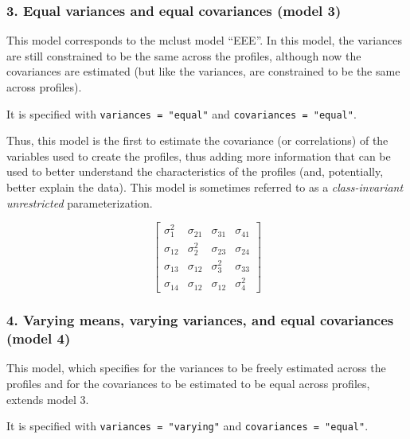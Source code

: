 \documentclass[
  english,
  man]{apa6}
\begin{document}
\hypertarget{equal-variances-and-equal-covariances-model-3}{%
\subsubsection{3. Equal variances and equal covariances (model 3)}\label{equal-variances-and-equal-covariances-model-3}}

This model corresponds to the mclust model \enquote{EEE}. In this model, the variances are still constrained to be the same across the profiles, although now the covariances are estimated (but like the variances, are constrained to be the same across profiles).

It is specified with \texttt{variances\ =\ "equal"} and \texttt{covariances\ =\ "equal"}.

Thus, this model is the first to estimate the covariance (or correlations) of the variables used to create the profiles, thus adding more information that can be used to better understand the characteristics of the profiles (and, potentially, better explain the data). This model is sometimes referred to as a \emph{class-invariant unrestricted} parameterization.

\[
\left[ \begin{matrix} { \sigma  }_{ 1 }^{ 2 } & { \sigma  }_{ 21 } & { \sigma  }_{ 31 } & { \sigma  }_{ 41 } \\ { \sigma  }_{ 12 } & { \sigma  }_{ 2 }^{ 2 } & { \sigma  }_{ 23 } & { \sigma  }_{ 24 } \\ { \sigma  }_{ 13 } & { \sigma  }_{ 12 } & { \sigma  }_{ 3 }^{ 2 } & { \sigma  }_{ 33 } \\ { \sigma  }_{ 14 } & { \sigma  }_{ 12 } & { \sigma  }_{ 12 } & { \sigma  }_{ 4 }^{ 2 } \end{matrix} \right] 
\]

\hypertarget{varying-means-varying-variances-and-equal-covariances-model-4}{%
\subsubsection{4. Varying means, varying variances, and equal covariances (model 4)}\label{varying-means-varying-variances-and-equal-covariances-model-4}}

This model, which specifies for the variances to be freely estimated across the profiles and for the covariances to be estimated to be equal across profiles, extends model 3.

It is specified with \texttt{variances\ =\ "varying"} and \texttt{covariances\ =\ "equal"}.
\end{document}
